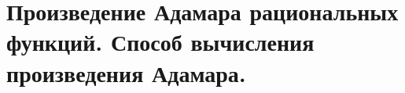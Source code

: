 \section{Произведение Адамара рациональных функций. Способ вычисления произведения Адамара.}

\newpage


